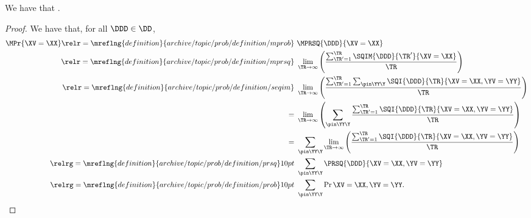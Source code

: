 \begin{proposition}
  We have that \mprobsqiprop.%
\end{proposition}

\begin{proof}
  We have that, for all $\DDD \in \DD$,
  \begin{align*}
    \MPr{\XV = \XX} \relr = {\mreflng{definition}{archive/topic/prob/definition/mprob}} \ &
                    \MPRSQ{\DDD}{\XV = \XX}\\
                    \relr = {\mreflng{definition}{archive/topic/prob/definition/mprsq}} \ & 
                    \lim_{\TR \rightarrow \infty}\left(\frac{\sum_{\TR' = 1}^{\TR}\SQIM{\DDD}{\TR'}{\XV = \XX}}{\TR}\right)\\
                    \relr = {\mreflng{definition}{archive/topic/prob/definition/seqim}} \ & 
                    \lim_{\TR \rightarrow \infty}\left(\frac{\sum_{\TR' = 1}^{\TR}\sum_{\pin\YY\Y} \SQI{\DDD}{\TR}{\XV = \XX, \YV = \YY}}{\TR}\right)\\
                    = \ & 
                    \lim_{\TR \rightarrow \infty}\left(\sum_{\pin\YY\Y} \frac{\sum_{\TR' = 1}^{\TR}\SQI{\DDD}{\TR}{\XV = \XX, \YV = \YY}}{\TR}\right)\\
                    = \ & 
                    \sum_{\pin\YY\Y} \lim_{\TR \rightarrow \infty}\left(\frac{\sum_{\TR' = 1}^{\TR}\SQI{\DDD}{\TR}{\XV = \XX, \YV = \YY}}{\TR}\right)\\
                    \relrg = {\mreflng{definition}{archive/topic/prob/definition/prsq}} 10pt \ & 
                    \sum_{\pin\YY\Y}\PRSQ{\DDD}{\XV = \XX, \YV = \YY}\\
                    \relrg = {\mreflng{definition}{archive/topic/prob/definition/prob}} 10pt \ & 
                    \sum_{\pin\YY\Y}\Pr{\XV = \XX, \YV = \YY}.
  \end{align*}
\end{proof}
